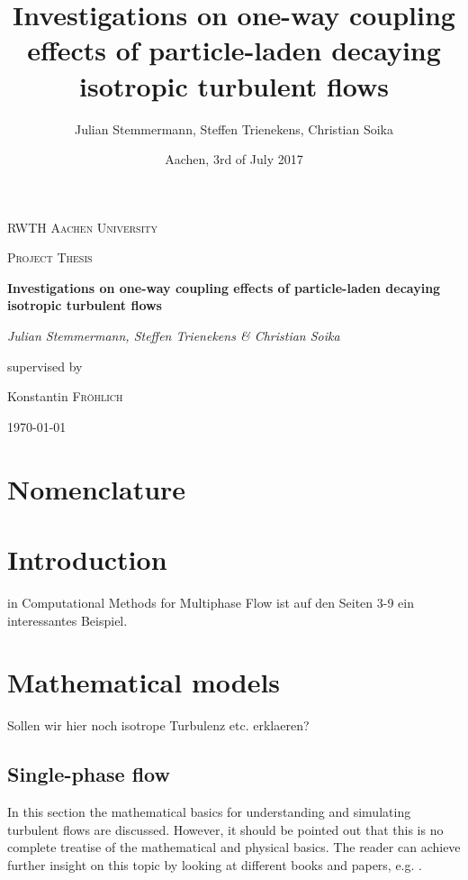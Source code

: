 \documentclass[a4paper,10pt]{article}
\title{Investigations on one-way coupling effects of particle-laden decaying isotropic turbulent flows}
\author{Julian Stemmermann, Steffen Trienekens, Christian Soika}
\date{Aachen, 3rd of July 2017}
\numberwithin{equation}{section} %
\begin{document}
\begin{titlepage}
	\centering
	{\scshape\LARGE RWTH Aachen University \par}
	\vspace{1cm}
	{\scshape\Large Project Thesis\par}
	\vspace{1.5cm}
	{\huge\bfseries Investigations on one-way coupling effects of particle-laden decaying isotropic turbulent flows \par}
	\vspace{2cm}
	{\Large\itshape Julian Stemmermann, Steffen Trienekens \& Christian Soika\par}
\vfill
	supervised by\par
	Konstantin \textsc{Fr\"ohlich}

\vfill

	{\large \today\par}
\end{titlepage}

\pagebreak

\tableofcontents{} %
 
\pagebreak

\section{Nomenclature}
\printnomenclature
\pagebreak

\section{Introduction}
in Computational Methods for Multiphase Flow ist auf den Seiten 3-9 ein interessantes Beispiel.
\pagebreak
\section{Mathematical models}
Sollen wir hier noch isotrope Turbulenz etc. erklaeren?
\subsection{Single-phase flow} %
In this section the mathematical basics for understanding and simulating turbulent flows are discussed. However, it should be pointed out that this is no
complete treatise of the mathematical and physical basics. The reader can achieve further insight on this topic by looking at different books and papers, 
e.g. \cite{turbulentFlows}.
\newline
\end{document}
